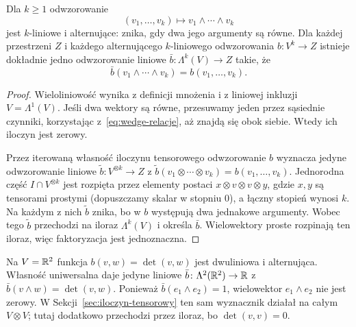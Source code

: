 \begin{twierdzenie}
\label{thm:wedge-multilinear}
Dla $k\geq1$ odwzorowanie
\[
 (v_1,\ldots,v_k)\longmapsto v_1\wedge\cdots\wedge v_k
\]
jest $k$-liniowe i alternujące: znika, gdy dwa jego argumenty
są równe. Dla każdej przestrzeni $Z$ i każdego alternującego
$k$-liniowego odwzorowania $b\colon V^k\to Z$ istnieje dokładnie jedno
odwzorowanie liniowe $\bar b\colon\Lambda^k(V)\to Z$ takie, że
\[
 \bar b(v_1\wedge\cdots\wedge v_k)=b(v_1,\ldots,v_k).
\]
\end{twierdzenie}
\begin{proof}
Wieloliniowość wynika z definicji mnożenia i z liniowej
inkluzji $V=\Lambda^1(V)$. Jeśli dwa wektory są równe,
przesuwamy jeden przez sąsiednie czynniki, korzystając
z~\eqref{eq:wedge-relacje}, aż znajdą się obok siebie.
Wtedy ich iloczyn jest zerowy.

Przez iterowaną własność iloczynu tensorowego odwzorowanie $b$
wyznacza jedyne odwzorowanie liniowe
$\widetilde b\colon V^{\otimes k}\to Z$ z
$\widetilde b(v_1\otimes\cdots\otimes v_k)=b(v_1,\ldots,v_k)$.
Jednorodna część $I\cap V^{\otimes k}$ jest rozpięta
przez elementy postaci
$x\otimes v\otimes v\otimes y$, gdzie $x,y$ są tensorami
prostymi (dopuszczamy skalar w stopniu $0$), a łączny stopień
wynosi $k$. Na każdym z nich
$\widetilde b$ znika, bo w $b$ występują dwa jednakowe
argumenty. Wobec tego $\widetilde b$ przechodzi na iloraz
$\Lambda^k(V)$ i określa $\bar b$.
Wielowektory proste rozpinają ten iloraz, więc faktoryzacja
jest jednoznaczna.
\end{proof}

\begin{przyklad}
Na $V=\mathbb{R}^2$ funkcja $b(v,w)=\det(v,w)$ jest dwuliniowa
i alternująca. Własność uniwersalna daje jedyne liniowe
$\bar b\colon\Lambda^2(\mathbb{R}^2)\to\mathbb{R}$ z
$\bar b(v\wedge w)=\det(v,w)$.
Ponieważ $\bar b(e_1\wedge e_2)=1$, wielowektor
$e_1\wedge e_2$ nie jest zerowy. W
Sekcji~\ref{sec:iloczyn-tensorowy} ten sam
wyznacznik działał na całym $V\otimes V$;
tutaj dodatkowo przechodzi przez iloraz, bo
$\det(v,v)=0$.
\end{przyklad}

